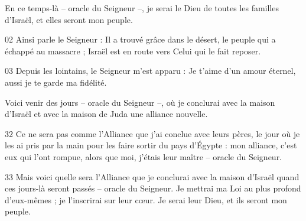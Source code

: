 En ce temps-là – oracle du Seigneur –, je serai le Dieu de toutes les familles d’Israël, et elles seront mon peuple.

02 Ainsi parle le Seigneur : Il a trouvé grâce dans le désert, le peuple qui a échappé au massacre ; Israël est en route vers Celui qui le fait reposer.

03 Depuis les lointains, le Seigneur m’est apparu : Je t’aime d’un amour éternel, aussi je te garde ma fidélité.

Voici venir des jours – oracle du Seigneur –, où je conclurai avec la maison d’Israël et avec la maison de Juda une alliance nouvelle.

32 Ce ne sera pas comme l’Alliance que j’ai conclue avec leurs pères, le jour où je les ai pris par la main pour les faire sortir du pays d’Égypte : mon alliance, c’est eux qui l’ont rompue, alors que moi, j’étais leur maître – oracle du Seigneur.

33 Mais voici quelle sera l’Alliance que je conclurai avec la maison d’Israël quand ces jours-là seront passés – oracle du Seigneur. Je mettrai ma Loi au plus profond d’eux-mêmes ; je l’inscrirai sur leur cœur. Je serai leur Dieu, et ils seront mon peuple.